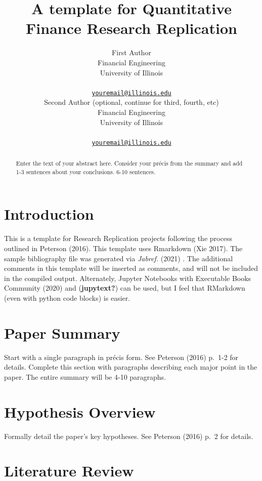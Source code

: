 \documentclass{article}
\title{A template for Quantitative Finance Research Replication}
\author{
    First Author
   \\
    Financial Engineering \\
    University of Illinois \\
   \\
  \texttt{\href{mailto:youremail@illinois.edu}{\nolinkurl{youremail@illinois.edu}}} \\
   \And
    Second Author (optional, continue for third, fourth, etc)
   \\
    Financial Engineering \\
    University of Illinois \\
   \\
  \texttt{\href{mailto:youremail@illinois.edu}{\nolinkurl{youremail@illinois.edu}}} \\
  }
\begin{document}
\maketitle


\begin{abstract}
Enter the text of your abstract here. Consider your précis from the
summary and add 1-3 sentences about your conclusions. 6-10 sentences.
\end{abstract}


\hypertarget{introduction}{%
\section{Introduction}\label{introduction}}

This is a template for Research Replication projects following the
process outlined in Peterson (2016). This template uses Rmarkdown (Xie
2017). The sample bibliography file was generated via \emph{Jabref.}
(2021) . The additional comments in this template will be inserted as
comments, and will not be included in the compiled output. Alternately,
Jupyter Notebooks with Executable Books Community (2020) and
(\textbf{jupytext?}) can be used, but I feel that RMarkdown (even with
python code blocks) is easier.

\hypertarget{paper-summary}{%
\section{Paper Summary}\label{paper-summary}}

Start with a single paragraph in précis form. See Peterson (2016) p.~1-2
for details. Complete this section with paragraphs describing each major
point in the paper. The entire summary will be 4-10 paragraphs.

\hypertarget{hypothesis-overview}{%
\section{Hypothesis Overview}\label{hypothesis-overview}}

Formally detail the paper's key hypotheses. See Peterson (2016) p.~2 for
details.

\hypertarget{literature-review}{%
\section{Literature Review}\label{literature-review}}
\end{document}
